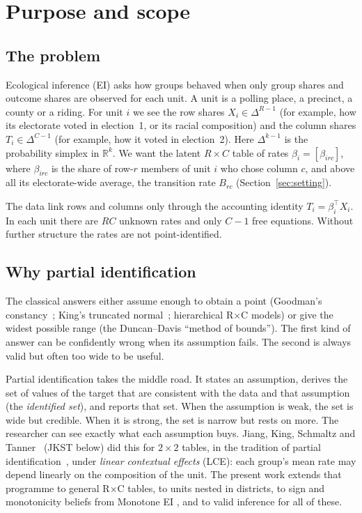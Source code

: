 \section{Purpose and scope}\label{sec:purpose}

\subsection{The problem}

Ecological inference (EI) asks how groups behaved when only group shares and
outcome shares are observed for each unit. A unit is a polling place, a
precinct, a county or a riding. For unit $i$ we see the row shares
$X_i\in\Delta^{R-1}$ (for example, how its electorate voted in election~1, or
its racial composition) and the column shares $T_i\in\Delta^{C-1}$ (for
example, how it voted in election~2). Here $\Delta^{k-1}$ is the probability
simplex in $\mathbb R^k$. We want the latent $R\times C$ table of rates
$\beta_i=[\beta_{irc}]$, where $\beta_{irc}$ is the share of row-$r$ members
of unit $i$ who chose column $c$, and above all its electorate-wide average,
the transition rate $B_{rc}$ (Section~\ref{sec:setting}).

The data link rows and columns only through the accounting identity
$T_i=\beta_i^\top X_i$. In each unit there are $RC$ unknown rates and only
$C-1$ free equations. Without further structure the rates are not
point-identified.

\subsection{Why partial identification}

The classical answers either assume enough to obtain a point (Goodman's
constancy~\citep{goodman1953}; King's truncated normal~\citep{king1997}; hierarchical R$\times$C models) or give the
widest possible range (the Duncan--Davis ``method of bounds''). The first
kind of answer can be confidently wrong when its assumption fails. The second
is always valid but often too wide to be useful.

Partial identification takes the middle road. It states an assumption, derives
the set of values of the target that are consistent with the data and that
assumption (the \emph{identified set}), and reports that set. When the
assumption is weak, the set is wide but credible. When it is strong, the set is
narrow but rests on more. The researcher can see exactly what each assumption
buys. Jiang, King, Schmaltz and Tanner~\citep{jkst2019} (JKST below) did this
for $2\times2$ tables, in the tradition of partial identification~\citep{molinari2020}, under \emph{linear contextual effects} (LCE): each
group's mean rate may depend linearly on the composition of the unit. The
present work extends that programme to general R$\times$C tables, to units
nested in districts, to sign and monotonicity beliefs from Monotone EI
\citep{egghm2025}, and to valid inference for all of these.

